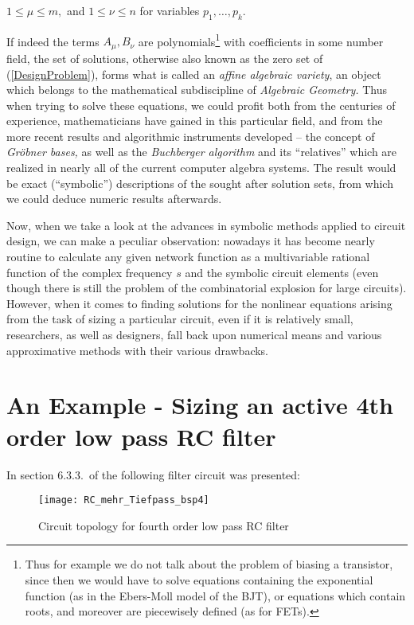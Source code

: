 \documentclass[10pt,twocolumn,pagenumbers]{IEEEtran}
\begin{document}
\noindent
$1\le \mu\le m,$ and $1\le \nu \le n$ for variables $p_1,\dots,p_k.$

\noindent
If indeed the terms $A_\mu, B_\nu$ are polynomials\footnote{Thus for example we do not talk about the problem of biasing a transistor, since then we would have to solve equations containing the exponential function (as in the Ebers-Moll model of the BJT), or equations which contain roots, and moreover are piecewisely defined (as for FETs).} with coefficients in some number field, 
the set of solutions, other\-wise also known as the zero set of (\ref{DesignProblem}), 
forms what is called an {\sl affine algebraic variety}, an object which belongs to the mathematical subdiscipline  
 of {\sl Algebraic Geometry.}
Thus when trying to solve these equations, we could profit both from the centuries of experience, mathematicians have gained in this particular field, and from
the more recent results and algorithmic instruments developed
-- the concept of {\sl Gr\"obner bases,} as well as the {\sl Buchberger algorithm} and its ``relatives'' which are realized  in nearly all of the current computer algebra systems. 
The result would be exact (``symbolic'') descriptions of the sought after solution sets, from which we could deduce numeric results afterwards. 

\noindent
Now, when we take a look at the advances in symbolic methods applied to circuit design, we can make a peculiar observation: nowadays it has become nearly routine to calculate any given network function as a multivariable rational function of the complex frequency $s$ and the symbolic circuit elements (even though there is still the problem of the combinatorial explosion for large circuits). However, when it comes to finding solutions for the nonlinear equations arising from the task of sizing a particular circuit, even if it is relatively small, researchers, as well as designers, fall back upon numerical means and various approximative methods with their various drawbacks.


\section{An Example - Sizing an active 4th order low pass RC filter}

In section 6.3.3.\ of \cite{HieuDiss} the following filter circuit was presented:

\begin{figure}[!ht]
\begin{center}
\texttt{[image: RC\_mehr\_Tiefpass\_bsp4]}
\parbox{.8\linewidth}{
\caption{Circuit topology for fourth order low pass RC filter}
}
\end{center}
\end{figure}
\end{document}
